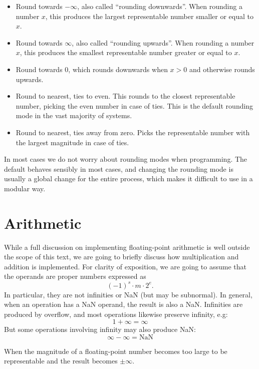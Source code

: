 \begin{itemize}
\item Round towards $-\infty$, also called ``rounding downwards''.
  When rounding a number $x$, this produces the largest representable
  number smaller or equal to $x$.
\item Round towards $\infty$, also called ``rounding upwards''.
  When rounding a number $x$, this produces the smallest representable
  number greater or equal to $x$.
\item Round towards $0$, which rounds downwards when $x>0$ and
  otherwise rounds upwards.
\item Round to nearest, ties to even.  This rounds to the closest
  representable number, picking the even number in case of ties.  This
  is the default rounding mode in the vast majority of systems.
\item Round to nearest, ties away from zero.  Picks the representable
  number with the largest magnitude in case of ties.
\end{itemize}

In most cases we do not worry about rounding modes when programming.
The default behaves sensibly in most cases, and changing the rounding
mode is usually a global change for the entire process, which makes it
difficult to use in a modular way.

\section{Arithmetic}
\label{sec:float-arithmetic}

While a full discussion on implementing floating-point arithmetic is
well outside the scope of this text, we are going to briefly discuss
how multiplication and addition is implemented.  For clarity of
exposition, we are going to assume that the operands are proper
numbers expressed as
\[
  (-1)^{s} \cdot m \cdot 2^{e}.
\]
In particular, they are not infinities or NaN (but may be subnormal).
In general, when an operation has a NaN operand, the result is also a
NaN.  Infinities are produced by overflow, and most operations
likewise preserve infinity, e.g:
\begin{equation}
  1 + \infty = \infty
\end{equation}
But some operations involving infinity may also produce NaN:
\begin{equation}
  \infty - \infty = \text{NaN}
\end{equation}

\begin{definition}
  When the magnitude of a floating-point number becomes too large to
  be representable and the result becomes $\pm\infty$.
\end{definition}

